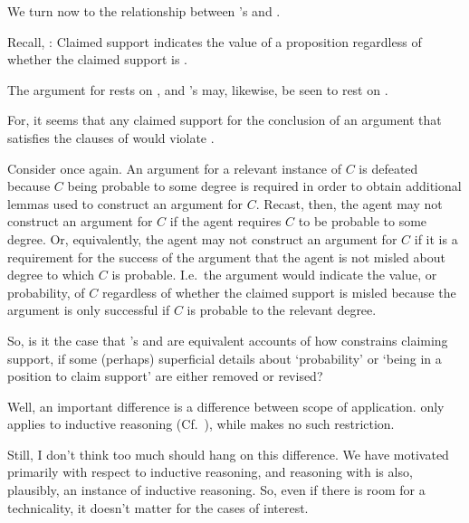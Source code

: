 \begin{note}[In relation to \nI{}]
  We turn now to the relationship between \citeauthor{Weisberg:2010to}'s \wnf{} and \nI{}.

  Recall, \eiS{}:
  Claimed support indicates the value of a proposition regardless of whether the claimed support is \mom{}.

  The argument for \nI{} rests on \eiS{}, and \citeauthor{Weisberg:2010to}'s \wnf{} may, likewise, be seen to rest on \eiS{}.

  For, it seems that any claimed support for the conclusion of an argument that satisfies the clauses of \wnf{} would violate \eiS{}.

  Consider \wnf{} once again.
  An argument for a relevant instance of \(C\) is defeated because \(C\) being probable to some degree is required in order to obtain additional lemmas used to construct an argument for \(C\).
  Recast, then, the agent may not construct an argument for \(C\) if the agent requires \(C\) to be probable to some degree.
  Or, equivalently, the agent may not construct an argument for \(C\) if it is a requirement for the success of the argument that the agent is not misled about degree to which \(C\) is probable.
  I.e.\ the argument would indicate the value, or probability, of \(C\) regardless of whether the claimed support is misled because the argument is only successful if \(C\) is probable to the relevant degree.

  So, is it the case that \citeauthor{Weisberg:2010to}'s \wnf{} and \nI{} are equivalent accounts of how \eiS{} constrains claiming support, if some (perhaps) superficial details about `probability' or `being in a position to claim support' are either removed or revised?
\end{note}

\begin{note}[Technicality]
  Well, an important difference is a difference between scope of application.
  \wnf{} only applies to inductive reasoning (Cf.~\Citeyear[533]{Weisberg:2010to}), while \nI{} makes no such restriction.

  Still, I don't think too much should hang on this difference.
  We have motivated \nI{} primarily with respect to inductive reasoning, and reasoning with \gsi{-} is also, plausibly, an instance of inductive reasoning.
  So, even if there is room for a technicality, it doesn't matter for the cases of interest.
\end{note}

